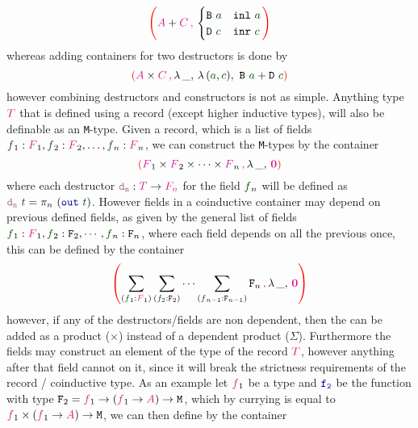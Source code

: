 \documentclass[twoside,11pt,openright]{report}
\theoremstyle{plain} %
\theoremstyle{definition}
\theoremstyle{remark}
\newcommand*{\term}[1]{\textcolor{green!30!black}{#1}} %
\newcommand*{\type}[1]{\textcolor{magenta!90!black}{#1}}
\newcommand*{\containerpair}[2]{\ensuremath{\colorlet{savedleftcolor}{.}\color{red}\left(\color{savedleftcolor}#1\,\textcolor{red}{\mathbf{,}}\,#2\color{red}\right)\color{savedleftcolor}}}
\newcommand*{\containerpairsimple}[2]{\containerpair{#1}{\lambda\,\_,\,#2}}
\newcommand*{\empt}{\type{\textbf{0}}}
\newcommand*{\function}[1]{\textcolor{blue!60!black}{\ensuremath{\mathtt{#1}}}}
\newcommand*{\destructor}[1]{\textcolor{pink!60!black}{\ensuremath{\mathtt{#1}}}}
\newcommand*{\typeformer}[1]{\ensuremath{\mathtt{#1}}}
\begin{document}
\begin{equation}
  \containerpair{\type{A} + \type{C}}{ \begin{cases} \typeformer{B}~\term{a} & \mathtt{inl}~\term{a} \\ \typeformer{D}~\term{c} & \mathtt{inr}~\term{c} \end{cases}}
\end{equation}
whereas adding containers for two destructors is done by 
\begin{equation}
  \containerpairsimple{\type{A} \times \type{C}}{\lambda\,(\term{a},\term{c}),~\typeformer{B}~\term{a} + \typeformer{D}~\term{c}}  
\end{equation}
however combining destructors and constructors is not as simple. Anything type \(\type{T}\) that is defined using a record (except higher inductive types), will also be definable as an \texttt{M}-type. Given a record, which is a list of fields \(\term{f}_1 : \type{F}_1,\term{f}_2 : \type{F}_2,\dots,\term{f}_n : \type{F}_n\), we can construct the \texttt{M}-types by the container
\begin{equation}
  \containerpairsimple{\type{F}_1 \times \type{F}_2 \times \dots \times \type{F}_n}{\empt}
\end{equation}
where each destructor \(\destructor{d_n} : \type{T} \rightarrow \type{F_n}\) for the field \(\term{f}_n\) will be defined as \(\destructor{d_n}~\term{t} = \pi_n~(\function{out}~\term{t})\). However fields in a coinductive container may depend on previous defined fields, as given by the general list of fields \(\term{f}_1 : \type{F}_1,\term{f}_2 : \typeformer{F}_2,\cdots,\term{f}_n : \typeformer{F}_n\), where each field depends on all the previous once, this can be defined by the container
\begin{equation}
  \containerpairsimple{\sum_{(\term{f}_1 : \type{F}_1)} \sum_{(\term{f_2} : \typeformer{F}_2)} \cdots \sum_{(\term{f}_{n-1} : \typeformer{F}_{n-1})}\typeformer{F}_n}{\empt}
\end{equation}
however, if any of the destructors/fields are non dependent, then the can be added as a product (\(\times\)) instead of a dependent product (\(\Sigma\)). Furthermore the fields may construct an element of the type of the record \(\type{T}\), however anything after that field cannot on it, since it will break the strictness requirements of the record / coinductive type. As an example let \(\type{f}_1\) be a type and \(\function{f_2}\) be the function with type \(\typeformer{F}_2 = \type{f}_1 \rightarrow (\type{f}_1 \rightarrow \type{A}) \rightarrow \mathtt{M}\), which by currying is equal to \(\type{f}_1 \times (\type{f}_1 \rightarrow \type{A}) \rightarrow \mathtt{M}\), we can then define by the container
\end{document}
